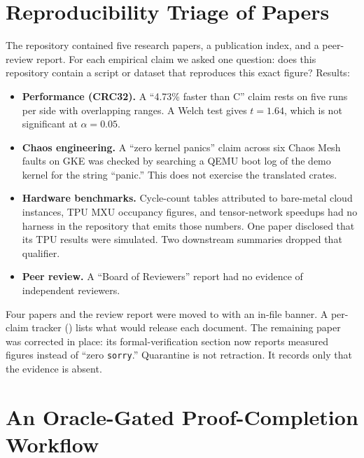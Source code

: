 \documentclass[sigconf,nonacm]{acmart}
\begin{document}
\section{Reproducibility Triage of Papers}\label{sec:papers}
The repository contained five research papers, a publication index, and a peer-review report. For each empirical claim we asked one question: does this repository contain a script or dataset that reproduces this exact figure? Results:
\begin{itemize}
\item \textbf{Performance (CRC32).} A ``4.73\% faster than C'' claim rests on five runs per side with overlapping ranges. A Welch test gives $t=1.64$, which is not significant at $\alpha=0.05$.
\item \textbf{Chaos engineering.} A ``zero kernel panics'' claim across six Chaos Mesh faults on GKE was checked by searching a QEMU boot log of the demo kernel for the string ``panic.'' This does not exercise the translated crates.
\item \textbf{Hardware benchmarks.} Cycle-count tables attributed to bare-metal cloud instances, TPU MXU occupancy figures, and tensor-network speedups had no harness in the repository that emits those numbers. One paper disclosed that its TPU results were simulated. Two downstream summaries dropped that qualifier.
\item \textbf{Peer review.} A ``Board of Reviewers'' report had no evidence of independent reviewers.
\end{itemize}
Four papers and the review report were moved to  with an in-file banner. A per-claim tracker () lists what would release each document. The remaining paper was corrected in place: its formal-verification section now reports measured figures instead of ``zero \texttt{sorry}.'' Quarantine is not retraction. It records only that the evidence is absent.

\section{An Oracle-Gated Proof-Completion Workflow}\label{sec:workflow}
\end{document}
